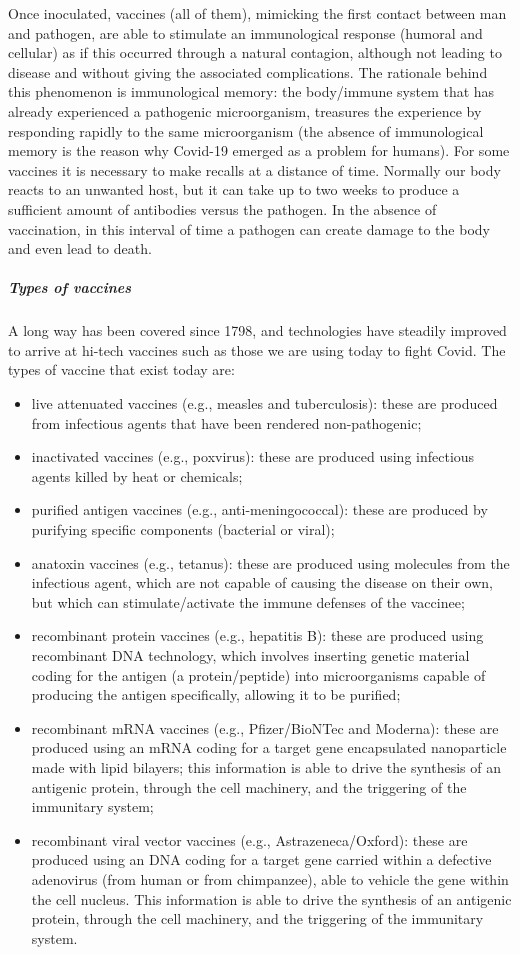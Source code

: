 \documentclass[graybox]{svmult}
\begin{document}
Once inoculated, vaccines (all of them), mimicking the first contact between man and pathogen, are able to stimulate an immunological response (humoral and cellular) as if this occurred through a natural contagion, although not leading to disease and without giving the associated complications. The rationale behind this phenomenon is immunological memory: the body/immune system that has already experienced a pathogenic microorganism, treasures the experience by responding rapidly to the same microorganism (the absence of immunological memory is the reason why Covid-19 emerged as a problem for humans). For some vaccines it is necessary to make recalls at a distance of time. Normally our body reacts to an unwanted host, but it can take up to two weeks to produce a sufficient amount of antibodies versus the pathogen. In the absence of vaccination, in this interval of time a pathogen can create damage to the body and even lead to death. 
 
\subparagraph{Types of vaccines}
\label{types}

A long way has been covered since 1798, and technologies have steadily improved to arrive at hi-tech vaccines such as those we are using today to fight Covid. The types of vaccine that exist today are:

\begin{itemize}
\item live attenuated vaccines (e.g., measles and tuberculosis): these are produced from infectious agents that have been rendered non-pathogenic;
\item inactivated vaccines (e.g., poxvirus): these are produced using infectious agents killed by heat or chemicals;
\item purified antigen vaccines (e.g., anti-meningococcal): these are produced by purifying specific components (bacterial or viral);
\item anatoxin vaccines (e.g., tetanus): these are produced using molecules from the infectious agent, which are not capable of causing the disease on their own, but which can stimulate/activate the immune defenses of the vaccinee;
\item recombinant protein vaccines (e.g., hepatitis B): these are produced using recombinant DNA technology, which involves inserting genetic material coding for the antigen (a protein/peptide) into microorganisms capable of producing the antigen specifically, allowing it to be purified;
\item recombinant mRNA vaccines (e.g., Pfizer/BioNTec and Moderna): these are produced using an mRNA coding for a target gene encapsulated nanoparticle made with lipid bilayers; this information is able to drive the synthesis of an antigenic protein, through the cell machinery, and the triggering of the immunitary system;
\item recombinant viral vector vaccines (e.g., Astrazeneca/Oxford): these are produced using an DNA coding for a target gene carried within a defective adenovirus (from human or from chimpanzee), able to vehicle the gene within the cell nucleus. This information is able to drive the synthesis of an antigenic protein, through the cell machinery, and the triggering of the immunitary system. 
\end{itemize}
\end{document}
